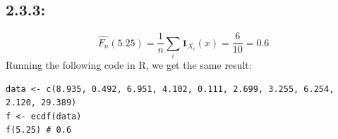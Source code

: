 \documentclass{article}
\begin{document}
\subsection*{2.3.3:}
$$\hat{F_n}(5.25)=\frac{1}{n}\sum_i\textbf{1}_{X_i}(x)=\frac{6}{10}=0.6$$
Running the following code in R, we get the same result:\\
\begin{verbatim}
data <- c(8.935, 0.492, 6.951, 4.102, 0.111, 2.699, 3.255, 6.254, 2.120, 29.389)
f <- ecdf(data)
f(5.25) # 0.6
\end{verbatim}
\end{document}
